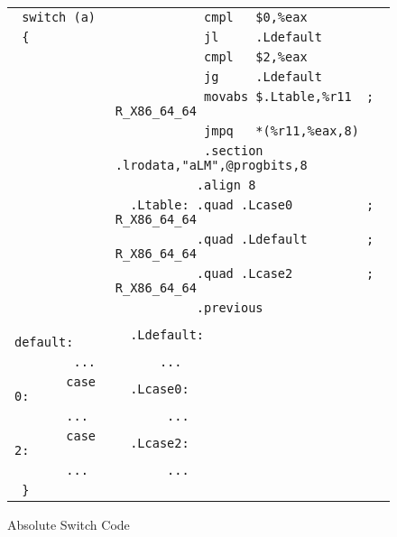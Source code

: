 \begin{figure}[H]
\Hrule
\caption{Absolute Switch Code}\label{large_abs_switch}
\begin{footnotesize}
\begin{tabular}{|l|l|}
\hline
\verb# switch (a)     # & \verb#            cmpl   $0,%eax           # \\
\verb# {              # & \verb#            jl     .Ldefault         # \\
\verb#                # & \verb#            cmpl   $2,%eax           # \\
\verb#                # & \verb#            jg     .Ldefault         # \\
\verb#                # & \verb#            movabs $.Ltable,%r11  ; R_X86_64_64 # \\
\verb#                # & \verb#            jmpq   *(%r11,%eax,8)    # \\
\verb#                # & \verb#            .section .lrodata,"aLM",@progbits,8 # \\
\verb#                # & \verb#           .align 8                  # \\ 
\verb#                # & \verb#  .Ltable: .quad .Lcase0          ; R_X86_64_64 # \\
\verb#                # & \verb#           .quad .Ldefault        ; R_X86_64_64 # \\
\verb#                # & \verb#           .quad .Lcase2          ; R_X86_64_64 # \\
\verb#                # & \verb#           .previous                 # \\
\verb#       default: # & \verb#  .Ldefault:                         # \\
\verb#        ...     # & \verb#      ...                            # \\
\verb#       case 0:  # & \verb#  .Lcase0:                           # \\
\verb#       ...      # & \verb#       ...                           # \\
\verb#       case 2:  # & \verb#  .Lcase2:                           # \\
\verb#       ...      # & \verb#       ...                           # \\
\verb# }              # & \verb#                                     # \\
\hline
\end{tabular}
\end{footnotesize}
\end{figure}

